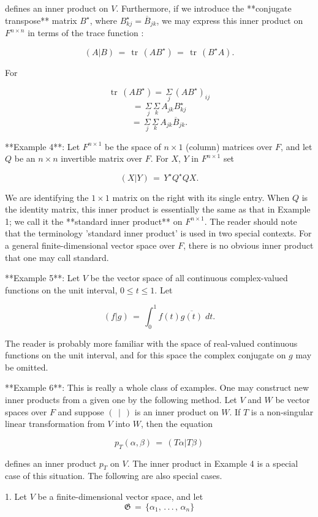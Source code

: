 defines an inner product on \(V\). Furthermore, if we introduce the **conjugate transpose** matrix \(B^{\star}\), where \(B^{\star}_{kj}=\overline{B}_{jk}\), we may express this inner product on \(F^{n\times n}\) in terms of the trace function :

\[(A|B)\,=\,\operatorname{tr}\,(AB^{\star})\,=\,\operatorname{tr}\,(B^{\star}A).\]

For

\[\operatorname{tr}\,(AB^{\star}) =\,\underset{j}{\Sigma}\,(AB^{\star})_{ij}\] \[=\,\underset{j}{\Sigma}\,\underset{k}{\Sigma}\,A_{jk}B^{\star}_{kj}\] \[=\,\underset{j}{\Sigma}\,\underset{k}{\Sigma}\,A_{jk}\overline{ B}_{jk}.\]

**Example 4**: Let \(F^{n\times 1}\) be the space of \(n\times 1\) (column) matrices over \(F\), and let \(Q\) be an \(n\times n\) invertible matrix over \(F\). For \(X\), \(Y\) in \(F^{n\times 1}\) set

\[(X|Y)\,=\,Y^{\star}Q^{\star}QX.\]

We are identifying the \(1\times 1\) matrix on the right with its single entry. When \(Q\) is the identity matrix, this inner product is essentially the same as that in Example 1; we call it the **standard inner product** on \(F^{n\times 1}\). The reader should note that the terminology 'standard inner product' is used in two special contexts. For a general finite-dimensional vector space over \(F\), there is no obvious inner product that one may call standard.

**Example 5**: Let \(V\) be the vector space of all continuous complex-valued functions on the unit interval, \(0\leq t\leq 1\). Let

\[(f|g)\,=\,\int_{0}^{1}f(t)\overline{g(t)}\;dt.\]

The reader is probably more familiar with the space of real-valued continuous functions on the unit interval, and for this space the complex conjugate on \(g\) may be omitted.

**Example 6**: This is really a whole class of examples. One may construct new inner products from a given one by the following method. Let \(V\) and \(W\) be vector spaces over \(F\) and suppose \((\ \ |\ \ )\) is an inner product on \(W\). If \(T\) is a non-singular linear transformation from \(V\) into \(W\), then the equation

\[p_{T}(\alpha,\beta)\,=\,(T\alpha|T\beta)\]

defines an inner product \(p_{T}\) on \(V\). The inner product in Example 4 is a special case of this situation. The following are also special cases.

1. Let \(V\) be a finite-dimensional vector space, and let \[\mathfrak{G}\,=\,\{\alpha_{1},\,.\,.\,.\,,\,\alpha_{n}\}\] 